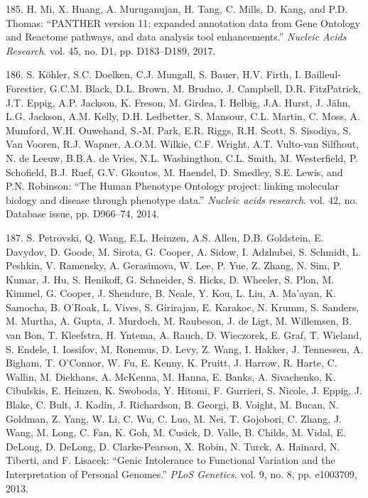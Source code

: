 \documentclass[12pt,a4paper,twoside]{ugathesis}
\theoremstyle{definition}
\theoremstyle{definition}
\theoremstyle{definition}
\theoremstyle{remark}
\begin{document}
\hypertarget{ref-Mi2017}{}
185. H. Mi, X. Huang, A. Muruganujan, H. Tang, C. Mills, D. Kang, and
P.D. Thomas: ``PANTHER version 11: expanded annotation data from Gene
Ontology and Reactome pathways, and data analysis tool enhancements.''
\emph{Nucleic Acids Research}. vol. 45, no. D1, pp. D183--D189, 2017.

\hypertarget{ref-Kohler2014}{}
186. S. Köhler, S.C. Doelken, C.J. Mungall, S. Bauer, H.V. Firth, I.
Bailleul-Forestier, G.C.M. Black, D.L. Brown, M. Brudno, J. Campbell,
D.R. FitzPatrick, J.T. Eppig, A.P. Jackson, K. Freson, M. Girdea, I.
Helbig, J.A. Hurst, J. Jähn, L.G. Jackson, A.M. Kelly, D.H. Ledbetter,
S. Mansour, C.L. Martin, C. Moss, A. Mumford, W.H. Ouwehand, S.-M. Park,
E.R. Riggs, R.H. Scott, S. Sisodiya, S. Van Vooren, R.J. Wapner, A.O.M.
Wilkie, C.F. Wright, A.T. Vulto-van Silfhout, N. de Leeuw, B.B.A. de
Vries, N.L. Washingthon, C.L. Smith, M. Westerfield, P. Schofield, B.J.
Ruef, G.V. Gkoutos, M. Haendel, D. Smedley, S.E. Lewis, and P.N.
Robinson: ``The Human Phenotype Ontology project: linking molecular
biology and disease through phenotype data.'' \emph{Nucleic acids
research}. vol. 42, no. Database issue, pp. D966--74, 2014.

\hypertarget{ref-Petrovski2013}{}
187. S. Petrovski, Q. Wang, E.L. Heinzen, A.S. Allen, D.B. Goldstein, E.
Davydov, D. Goode, M. Sirota, G. Cooper, A. Sidow, I. Adzhubei, S.
Schmidt, L. Peshkin, V. Ramensky, A. Gerasimova, W. Lee, P. Yue, Z.
Zhang, N. Sim, P. Kumar, J. Hu, S. Henikoff, G. Schneider, S. Hicks, D.
Wheeler, S. Plon, M. Kimmel, G. Cooper, J. Shendure, B. Neale, Y. Kou,
L. Liu, A. Ma'ayan, K. Samocha, B. O'Roak, L. Vives, S. Girirajan, E.
Karakoc, N. Krumm, S. Sanders, M. Murtha, A. Gupta, J. Murdoch, M.
Raubeson, J. de Ligt, M. Willemsen, B. van Bon, T. Kleefstra, H. Yntema,
A. Rauch, D. Wieczorek, E. Graf, T. Wieland, S. Endele, I. Iossifov, M.
Ronemus, D. Levy, Z. Wang, I. Hakker, J. Tennessen, A. Bigham, T.
O'Connor, W. Fu, E. Kenny, K. Pruitt, J. Harrow, R. Harte, C. Wallin, M.
Diekhans, A. McKenna, M. Hanna, E. Banks, A. Sivachenko, K. Cibulskis,
E. Heinzen, K. Swoboda, Y. Hitomi, F. Gurrieri, S. Nicole, J. Eppig, J.
Blake, C. Bult, J. Kadin, J. Richardson, B. Georgi, B. Voight, M. Bucan,
N. Goldman, Z. Yang, W. Li, C. Wu, C. Luo, M. Nei, T. Gojobori, C.
Zhang, J. Wang, M. Long, C. Fan, K. Goh, M. Cusick, D. Valle, B. Childs,
M. Vidal, E. DeLong, D. DeLong, D. Clarke-Pearson, X. Robin, N. Turck,
A. Hainard, N. Tiberti, and F. Lisacek: ``Genic Intolerance to
Functional Variation and the Interpretation of Personal Genomes.''
\emph{PLoS Genetics}. vol. 9, no. 8, pp. e1003709, 2013.
\end{document}
